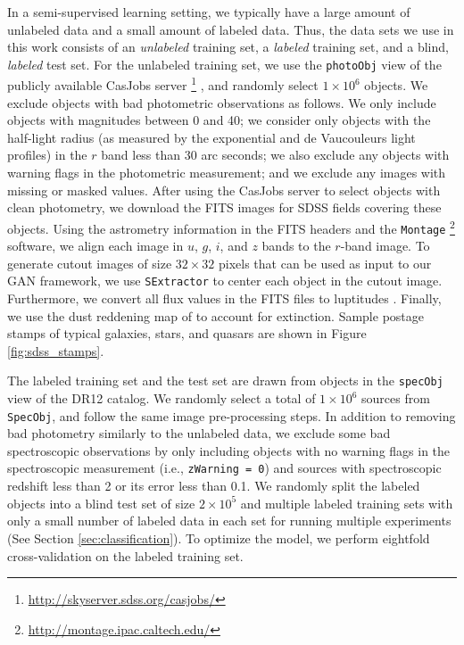 \documentclass[fleqn,usenatbib]{mnras}
\newcommand{\ie}{{i.e., }}
\begin{document}
In a semi-supervised learning setting, we typically have a large amount of unlabeled data
and a small amount of labeled data.
Thus, the data sets we use in this work consists of an \emph{unlabeled} training set,
a \emph{labeled} training set, and a blind, \emph{labeled} test set.
For the unlabeled training set, we use the \texttt{photoObj} view of the publicly available CasJobs server \footnote{\url{http://skyserver.sdss.org/casjobs/}} \citep{li2008casjobs},
and randomly select $1 \times 10^6$ objects.
We exclude objects with bad photometric observations as follows.
We only include objects with magnitudes between 0 and 40;
we consider only objects with the half-light radius (as measured by the exponential and de Vaucouleurs light profiles)
in the $r$ band less than 30 arc seconds;
we also exclude any objects with warning flags in the photometric measurement;
and we exclude any images with missing or masked values.
After using the CasJobs server to select objects with clean photometry,
we download the FITS images for SDSS fields covering these objects.
Using the astrometry information in the FITS headers and the \texttt{Montage} \footnote{\url{http://montage.ipac.caltech.edu/}} software,
we align each image in $u$, $g$, $i$, and $z$ bands to the $r$-band image.
To generate cutout images of size $32 \times 32$ pixels that can be used as input to our GAN framework,
we use \texttt{SExtractor} to center each object in the cutout image.
Furthermore, we convert all flux values in the FITS files to luptitudes
\citep[\ie inverse hyperbolic sine magnitudes;][]{lupton1999modified}.
Finally, we use the dust reddening map of \citet{schlegel1998maps} to account for extinction.
Sample postage stamps of typical galaxies, stars, and quasars are shown in Figure \ref{fig:sdss_stamps}.

The labeled training set and the test set are drawn from objects in the \texttt{specObj} view of the DR12 catalog.
We randomly select a total of $1 \times 10^6$ sources from \texttt{SpecObj}, and follow the same image pre-processing steps.
In addition to removing bad photometry similarly to the unlabeled data,
we exclude some bad spectroscopic observations by only including objects with no warning flags in the spectroscopic measurement
(\ie \texttt{zWarning = 0})
and sources with spectroscopic redshift less than 2 or its error less than 0.1.
We randomly split the labeled objects into a blind test set of size $ 2 \times 10^5$ and multiple labeled training sets
with only a small number of labeled data in each set for running multiple experiments (See Section \ref{sec:classification}).
To optimize the model, we perform eightfold cross-validation on the labeled training set.
\end{document}

